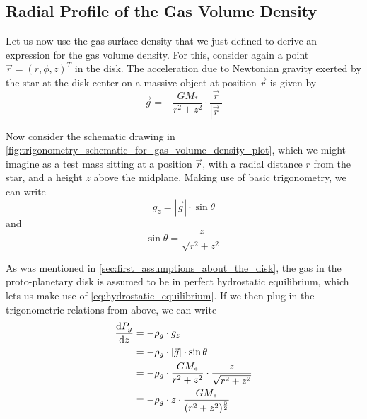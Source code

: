     \newpage\subsection{Radial Profile of the Gas Volume Density}

        Let us now use the gas surface density that we just defined to 
        derive an expression for the gas volume density. 
        For this, 
        consider again a point $\vec r=(r,\phi,z)^T$ in the disk. 
        The acceleration due to Newtonian gravity exerted by the star at the disk center 
        on a massive object at position $\vec r$ is given by
        \begin{equation}
            \vec g = -\frac{GM_*}{r^2+z^2} \cdot \frac{\vec r}{|\vec r|}
        \end{equation}

        Now consider the schematic drawing in
        \cref{fig:trigonometry_schematic_for_gas_volume_density_plot}, which we might imagine as 
        a test mass sitting at a position $\vec r$, with a radial distance $r$ from the star, and 
        a height $z$ above the midplane. Making use of basic trigonometry, we can write
        \begin{equation}
            g_z = |\vec g| \cdot \sin\theta
        \end{equation}
        and
        \begin{equation}
            \sin\theta=\frac{z}{\sqrt{r^2+z^2}}
        \end{equation}

        As was mentioned in \cref{sec:first_assumptions_about_the_disk}, the gas in the 
        proto-planetary disk is assumed to be in perfect hydrostatic equilibrium, which lets us 
        make use of \cref{eq:hydrostatic_equilibrium}. If we then plug in the trigonometric 
        relations from above, we can write
        \begin{align}
            \frac{\text{d} P_g}{\text{d} z}
                &= -\rho_g \cdot g_z \\
                &= -\rho_g \cdot |\vec g| \cdot \sin\theta \\
                &= -\rho_g \cdot \frac{GM_*}{r^2+z^2} \cdot\frac{z}{\sqrt{r^2+z^2}} \\
                &= -\rho_g \cdot z \cdot\frac{GM_*}{ (r^2+z^2)^{\frac{3}{2}} }
                \label{eq:hydrostatic_equilibrium_with_plugged_in_trigonometry}
        \end{align}

